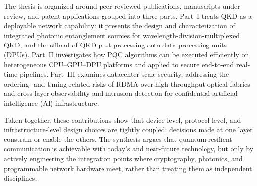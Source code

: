 The thesis is organized around peer-reviewed publications, manuscripts under
review, and patent applications grouped into three parts. Part~I treats QKD as a
deployable network capability: it presents the design and characterization of
integrated photonic entanglement sources for wavelength-division-multiplexed
QKD, and the offload of QKD post-processing onto data processing units (DPUs).
Part~II investigates how PQC algorithms can be executed efficiently on
heterogeneous CPU--GPU--DPU platforms and applied to secure end-to-end real-time
pipelines. Part~III examines datacenter-scale security, addressing the
ordering- and timing-related risks of RDMA over high-throughput optical fabrics
and cross-layer observability and intrusion detection for confidential artificial
intelligence (AI) infrastructure.

Taken together, these contributions show that device-level, protocol-level, and
infrastructure-level design choices are tightly coupled: decisions made at one
layer constrain or enable the others. The synthesis argues that
quantum-resilient communication is achievable with today's and near-future
technology, but only by actively engineering the integration points where cryptography,
photonics, and programmable network hardware meet, rather than treating them as
independent disciplines.
